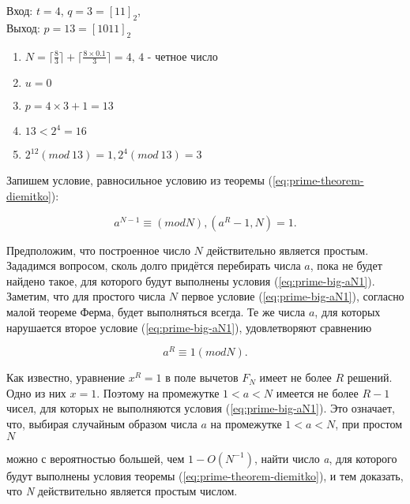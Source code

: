       \begin{example}
	Вход: {$t = 4$}, {$q = 3 = [11]_{2}$}, \\
	Выход: {$p = 13 = [1011]_{2}$}
	
	  \begin{enumerate}
	   \item {$N = \lceil \frac{8}{3} \rceil + \lceil \frac{8 \times 0.1}{3} \rceil = 4$}, {$4$} - четное число
	   \item {$u = 0$}
	   \item {$p = 4 \times 3 + 1 = 13$}
	   \item {$13 < 2^{ 4} = 16$}
	   \item {$2^{ 12}(mod \: 13) = 1, 2^{ 4}(mod \: 13) = 3$}
	  \end{enumerate}  
	
      \end{example}

  Запишем условие, равносильное условию из теоремы (\ref{eq:prime-theorem-diemitko}):
  
    \begin{equation} \label{eq:prime-big-aN1}
       a^{ N - 1} \equiv (mod N), (a^{ R} - 1, N) = 1.
    \end{equation}
      
  Предположим, что построенное число {$N$} действительно является простым. Зададимся вопросом, сколь долго придётся 
  перебирать числа {$a$}, пока не будет найдено такое, для которого будут выполнены условия (\ref{eq:prime-big-aN1}). Заметим, что для простого числа {$N$}
  первое условие (\ref{eq:prime-big-aN1}), согласно малой теореме Ферма, будет выполняться всегда. Те же числа {$a$}, для которых нарушается второе 
  условие (\ref{eq:prime-big-aN1}), удовлетворяют сравнению

  \begin{equation} \label{eq:prime-big-ar1}
   a^{ R} \equiv 1(mod N).
  \end{equation}

  Как известно, уравнение {$x^{ R} = 1$} в поле вычетов {$F_{N}$} имеет не более {$R$} решений. 
  Одно из них {$x = 1$}. Поэтому на промежутке {$1 < a < N$} имеется не более {$R - 1$} чисел, для которых не выполняются 
  условия (\ref{eq:prime-big-aN1}). Это означает, что, выбирая случайным образом числа {$a$} на промежутке {$1 < a < N$}, при простом {$N$}
  
  можно с вероятностью большей, чем {$1 - O(N^{ -1})$}, найти число \textit{a}, для которого будут выполнены условия 
  теоремы (\ref{eq:prime-theorem-diemitko}), и тем доказать, что \textit{N} действительно является простым числом.

